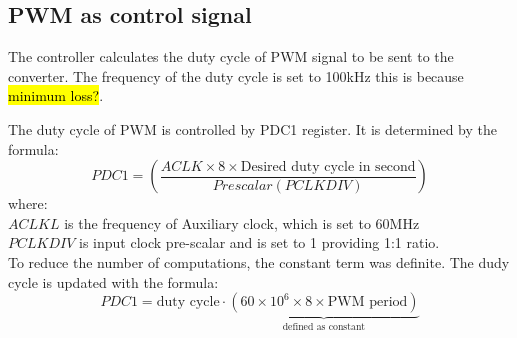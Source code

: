 \subsection{PWM as control signal}
The controller calculates the duty cycle of PWM signal to be sent to the converter. The frequency of the duty cycle is set to 100kHz this is because \hl{minimum loss?}. 

The duty cycle of PWM is controlled by PDC1 register. It is determined by the formula\cite{picPWM}:
\[
    PDC1 = \left( \frac{ACLK\times 8\times \text{Desired duty cycle in second}}{Prescalar (PCLKDIV)} \right)
\]
where:\\
$ACLKL$ is the frequency of Auxiliary clock, which is set to 60MHz\\
$PCLKDIV$ is input clock pre-scalar and is set to 1 providing 1:1 ratio. \\

To reduce the number of computations, the constant term was definite. The dudy cycle is  updated with the formula:
\[
    PDC1 = \text{duty cycle}\cdot \underbrace{(60\times10^6\times 8\times \text{PWM period})}_{\text{defined as constant}}
\]

